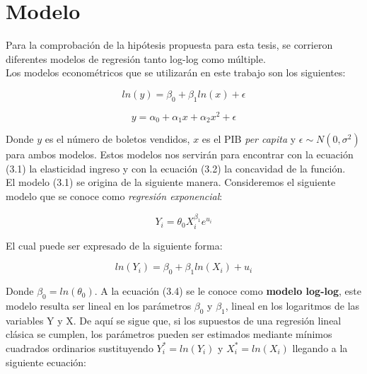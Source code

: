 




\newpage

\section{Modelo}

\noindent Para la comprobación de la hipótesis propuesta para esta tesis, se corrieron diferentes modelos de regresión tanto log-log como múltiple. \\

Los modelos econométricos que se utilizarán en este trabajo son los siguientes:

\begin{equation}
    ln(y) = \beta_0 + \beta_1 ln(x) + \epsilon
\end{equation}

\begin{equation}
    y = \alpha_0 + \alpha_1 x + \alpha_2 x^2 + \epsilon
\end{equation}
 
Donde $y$ es el número de boletos vendidos, $x$ es el PIB \textit{per capita} y $\epsilon \sim N(0,\sigma^2)$ para ambos modelos. Estos modelos nos servirán para encontrar con la ecuación (3.1) la elasticidad ingreso y con la ecuación (3.2) la concavidad de la función. \\

El modelo (3.1) se origina de la siguiente manera. Consideremos el siguiente modelo que se conoce como \textit{regresión exponencial}:

\begin{equation}
    Y_i = \theta_0 X_{i}^{\beta_1} e^{u_i}
\end{equation}

El cual puede ser expresado de la siguiente forma:

\begin{equation}
    ln (Y_i) = \beta_0 + \beta_1 ln (X_i) + u_i
\end{equation}

Donde $\beta_0 = ln (\theta_0)$. A la ecuación (3.4) se le conoce como \textbf{modelo log-log}, este modelo resulta ser lineal en los parámetros $\beta_0$ y $\beta_1$, lineal en los logaritmos de las variables Y y X. De aquí se sigue que, si los supuestos de una regresión lineal clásica se cumplen, los parámetros pueden ser estimados mediante mínimos cuadrados ordinarios sustituyendo $Y_i^* = ln (Y_i)$ y $X_i^* = ln(X_i)$ llegando a la siguiente ecuación:

